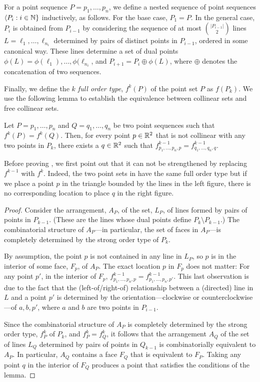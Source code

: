 \documentclass{patmorin}
\begin{document}
For a point sequence $P=p_1,\ldots,p_n$, we define a nested sequence
of point sequences $\langle P_i:i\in \mathbb{N}\}$ inductively, as follows.
For the base case, $P_1=P$. In the general case, $P_{i}$ is obtained from
$P_{i-1}$ by considering the sequence of at most $\binom{|P_{i-1}|}{2}$
lines $L=\ell_1,\ldots,\ell_{n_i}$ determined by pairs of distinct points
in $P_{i-1}$, ordered in some canonical way.  These lines determine
a set of dual points $\phi(L)=\phi(\ell_1),\ldots,\phi(\ell_{n_i}$,
and $P_{i+1}=P_i\oplus\phi(L)$, where $\oplus$ denotes the concatenation
of two sequences.

Finally, we define the \emph{$k$ full order type}, $f^k(P)$ of the
point set $P$ as $f(P_k)$.  We use the following lemma to establish the
equivalence between collinear sets and free collinear sets.

\begin{lem}
   Let $P=p_1,\ldots,p_n$ and $Q=q_1,\ldots,q_n$ be two point
   sequences such that  $f^k(P)=f^{k}(Q)$.  Then, for every point
   $p\in \mathbb{R}^2$ that is not collinear with any two points in $P_k$,
   there exists a $q\in\mathbb{R}^2$ such that $f^{k-1}_{p_1,\ldots,p_n,p} =
   f^{k-1}_{q_1,\ldots,q_n,q}$.
\end{lem}

Before proving , we first point out that it can not be
strengthened by replacing $f^{k-1}$ with $f^k$. Indeed, the two point
sets in  have the same full order type but if
we place a point $p$ in the triangle bounded by the lines in the left
figure, there is no corresponding location to place $q$ in the right 
figure.

\begin{proof}
   Consider the arrangement, $A_P$, of the set, $L_P$, of lines formed
   by pairs of points in $P_{k-1}$. (These are the lines whose dual
   points define $P_k\setminus P_{k-1}$.)  The combinatorial structure
   of $A_P$---in particular, the set of faces in $A_P$---is completely
   determined by the strong order type of $P_k$.

   By assumption, the point $p$ is not contained in any line in
   $L_P$, so $p$ is in the interior of some face, $F_p$, of $A_P$.
   The exact location $p$ in $F_p$ does not matter: For any point
   $p'$, in the interior of $F_p$, $f^{k-1}_{p_1,\ldots,p_n,p} =
   f^{k-1}_{p_1,\ldots,p_n,p'}$.  This last observation is due to the fact
   that the (left-of/right-of) relationship between a (directed) line in
   $L$ and   a point $p'$ is determined by the orientation---clockwise
   or counterclockwise---of $a,b,p'$, where $a$ and $b$ are two points
   in $P_{i-1}$.

   Since the combinatorial structure of $A_P$ is completely determined
   by the strong order type, $f^{k}_P$ of $P_k$, and $f^k_{P}=f^k_Q$, it
   follows that the arrangement $A_Q$ of the set of lines $L_Q$ determined
   by pairs of points in $Q_{k-1}$ is combinatorially equivalent to $A_P$.
   In particular, $A_Q$ contains a face $F_Q$ that is equivalent to $F_P$.
   Taking any point $q$ in the interior of $F_Q$ produces a point that
   satisfies the conditions of the lemma.
\end{proof}
\end{document}
